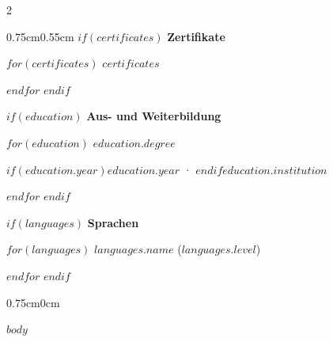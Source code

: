 \documentclass[10pt,a4paper]{article}
\newcommand{\sidebarsection}[1]{%
  \vspace{0.65cm}%
  {\large\bfseries\color{accent} #1}\par%
  \vspace{0.25cm}%
}
\begin{document}
\begin{paracol}{2}
\begin{adjustwidth}{0.75cm}{0.55cm}
$if(certificates)$
\nopagebreak
    \sidebarsection{Zertifikate}
$for(certificates)$
    {\small\color{textdark} $certificates$}\par\vspace{0.18cm}
$endfor$
$endif$

$if(education)$
\nopagebreak
    \sidebarsection{Aus- und Weiterbildung}
$for(education)$
    {\bfseries\small\color{textdark} $education.degree$}\par
    {\small\color{textmuted}$if(education.year)${\color{brand}\bfseries $education.year$} · $endif$$education.institution$}\par
    \vspace{0.26cm}
$endfor$
$endif$

$if(languages)$
\nopagebreak
    \sidebarsection{Sprachen}
$for(languages)$
    {\small\textbf{\color{textdark}$languages.name$}} {\small\color{textmuted}($languages.level$)}\par\vspace{0.18cm}
$endfor$
$endif$

\end{adjustwidth}

\switchcolumn

\begin{adjustwidth}{0.75cm}{0cm}
  \vspace{0.4cm}
  \color{textdark}
  \justifying

$body$

\end{adjustwidth}

\end{paracol}
\end{document}
